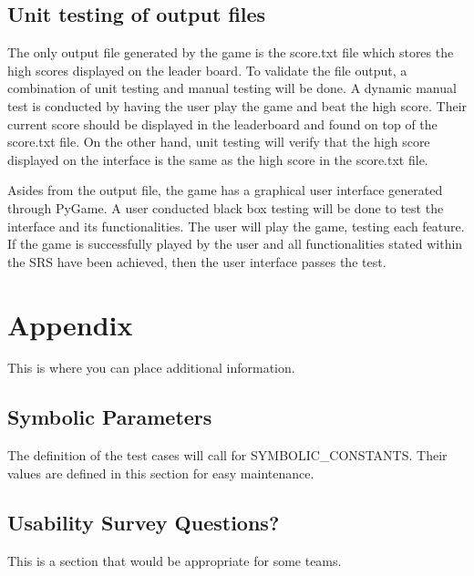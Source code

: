 \documentclass[12pt, titlepage]{article}
\begin{document}
	
	\subsection{Unit testing of output files}		
	
	The only output file generated by the game is the score.txt file which stores the high scores displayed on the leader board. To validate the file output, a combination of unit testing and manual testing will be done. A dynamic manual test is conducted by having the user play the game and beat the high score. Their current score should be displayed in the leaderboard and found on top of the score.txt file. On the other hand, unit testing will verify that the high score displayed on the interface is the same as the high score in the score.txt file. 
	
	Asides from the output file, the game has a graphical user interface generated through PyGame. A user conducted black box testing will be done to test the interface and its functionalities. The user will play the game, testing each feature. If the game is successfully played by the user and all functionalities stated within the SRS have been achieved, then the user interface passes the test.
	
	
	
	
	
	
	\newpage
	
	\section{Appendix}
	
	This is where you can place additional information.
	
	\subsection{Symbolic Parameters}
	
	The definition of the test cases will call for SYMBOLIC\_CONSTANTS.
	Their values are defined in this section for easy maintenance.
	
	\subsection{Usability Survey Questions?}
	
	This is a section that would be appropriate for some teams.
	
\end{document}

